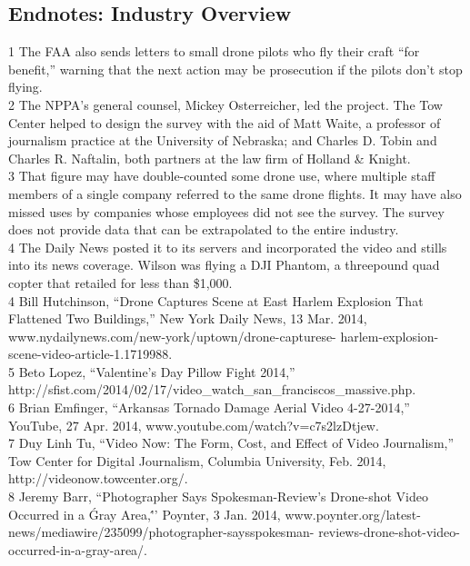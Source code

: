 \begin{itemize}
\begin{itemized}
\begin{itemize}
\section{Endnotes: Industry Overview}
1 The FAA also sends letters to small drone pilots who fly their craft ``for benefit,'' warning that the
next action may be prosecution if the pilots don't stop flying.\\
2 The NPPA's general counsel, Mickey Osterreicher, led the project. The Tow Center helped to
design the survey with the aid of Matt Waite, a professor of journalism practice at the University
of Nebraska; and Charles D. Tobin and Charles R. Naftalin, both partners at the law firm of
Holland & Knight.\\
3 That figure may have double-counted some drone use, where multiple staff members of a single
company referred to the same drone flights. It may have also missed uses by companies whose
employees did not see the survey. The survey does not provide data that can be extrapolated to the
entire industry.\\
4 The Daily News posted it to its servers and incorporated the video and
stills into its news coverage. Wilson was flying a DJI Phantom, a threepound
quad copter that retailed for less than \$1,000.\\
4 Bill Hutchinson, ``Drone Captures Scene at East Harlem Explosion That Flattened Two Buildings,''
New York Daily News, 13 Mar. 2014, www.nydailynews.com/new-york/uptown/drone-capturese-
harlem-explosion-scene-video-article-1.1719988.\\
5 Beto Lopez, ``Valentine's Day Pillow Fight 2014,'' http://sfist.com/2014/02/17/video_watch_san_franciscos_massive.php.\\
6 Brian Emfinger, ``Arkansas Tornado Damage Aerial Video 4-27-2014,'' YouTube, 27 Apr. 2014,
www.youtube.com/watch?v=c7s2lzDtjew.\\
7 Duy Linh Tu, ``Video Now: The Form, Cost, and Effect of Video Journalism,'' Tow Center for
Digital Journalism, Columbia University, Feb. 2014, http://videonow.towcenter.org/.\\
8 Jeremy Barr, ``Photographer Says Spokesman-Review's Drone-shot Video Occurred in a \'Gray Area,\'
'' Poynter, 3 Jan. 2014, www.poynter.org/latest-news/mediawire/235099/photographer-saysspokesman-
reviews-drone-shot-video-occurred-in-a-gray-area/.\\


\end{itemize}
\end{itemized}
\end{itemize}
